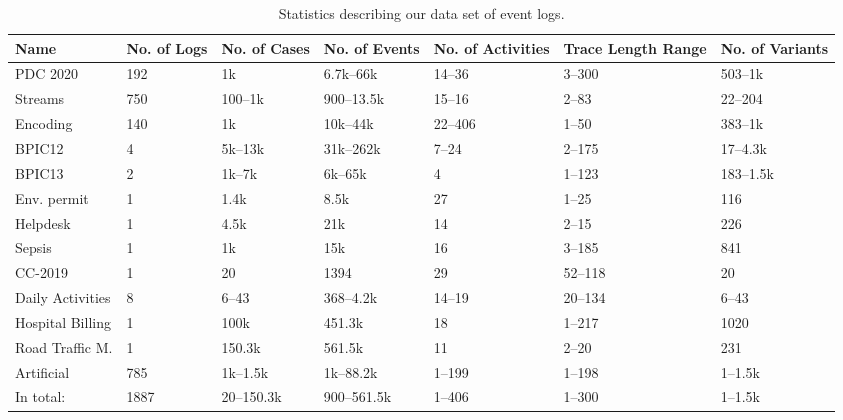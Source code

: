 \begin{table}[H]
\centering
\caption{Statistics describing our data set of event logs.}
\label{logs}
\begin{tabularx}{\textwidth}{|l|X|X|X|X|X|X|}
\hline
\textbf{Name} & \textbf{No. of Logs} & \textbf{No. of Cases} & \textbf{No. of Events} & \textbf{No. of Activities} & \textbf{Trace Length Range} & \textbf{No. of Variants} \\ \hline
PDC 2020 & 192 & 1k & 6.7k--66k & 14--36 & 3--300 & 503--1k \\ \hline
Streams & 750 & 100--1k & 900--13.5k & 15--16 & 2--83 & 22--204 \\ \hline
Encoding & 140 & 1k & 10k--44k & 22--406 & 1--50 & 383--1k \\ \hline
BPIC12 & 4 & 5k--13k & 31k--262k & 7--24 & 2--175 & 17--4.3k \\ \hline
BPIC13 & 2 & 1k--7k & 6k--65k & 4 & 1--123 & 183--1.5k \\ \hline
Env. permit & 1 & 1.4k & 8.5k & 27 & 1--25 & 116 \\ \hline
Helpdesk & 1 & 4.5k & 21k & 14 & 2--15 & 226 \\ \hline
Sepsis & 1 & 1k & 15k & 16 & 3--185 & 841 \\ \hline
CC-2019 & 1 & 20 & 1394 & 29 & 52--118 & 20 \\ \hline
Daily Activities & 8 & 6--43 & 368--4.2k & 14--19 & 20--134 & 6--43 \\ \hline
Hospital Billing & 1 & 100k & 451.3k & 18 & 1--217 & 1020 \\ \hline
Road Traffic M. &1 &  150.3k & 561.5k & 11 & 2--20 & 231 \\ \hline
Artificial & 785 & 1k--1.5k & 1k--88.2k  & 1--199 &  1--198 & 1--1.5k \\ \hline
In total: & 1887 & 20--150.3k & 900--561.5k & 1--406 & 1--300 & 1--1.5k \\ \hline
\end{tabularx}
\end{table}